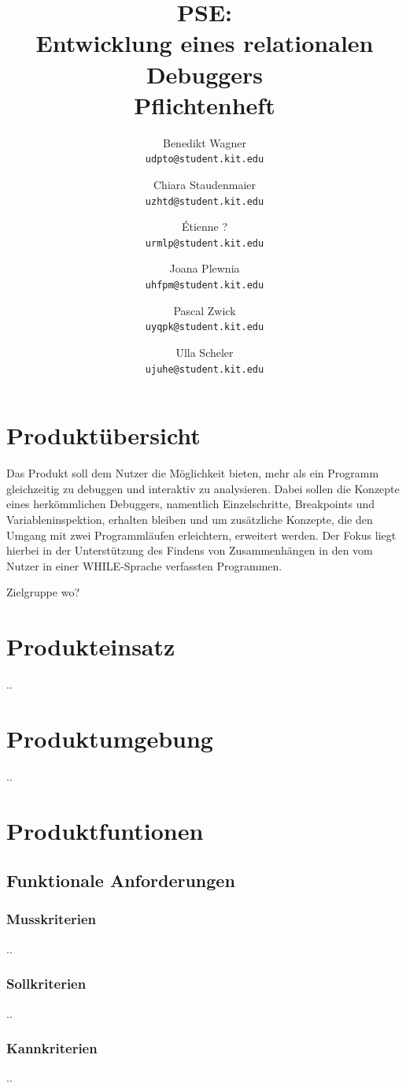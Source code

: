 \documentclass[parskip=full]{scrartcl}
\title{PSE:\\ Entwicklung eines relationalen Debuggers\\ Pflichtenheft}
\author{
	Benedikt Wagner\\
	\texttt{udpto@student.kit.edu}
	\and Chiara Staudenmaier\\
	\texttt{uzhtd@student.kit.edu}
	\and Étienne ?\\
	\texttt{urmlp@student.kit.edu}
	\and Joana Plewnia\\
	\texttt{uhfpm@student.kit.edu} 
	\and Pascal Zwick\\
	\texttt{uyqpk@student.kit.edu}
	\and Ulla Scheler\\
	\texttt{ujuhe@student.kit.edu}
}
\begin{document}
\maketitle
\newpage

\tableofcontents
\newpage

\section{Produktübersicht}
Das Produkt soll dem Nutzer die Möglichkeit bieten, mehr als ein Programm gleichzeitig zu debuggen und interaktiv zu analysieren. Dabei sollen die Konzepte eines herkömmlichen Debuggers, namentlich Einzelschritte, Breakpoints und Variableninspektion, erhalten bleiben und um zusätzliche Konzepte, die den Umgang mit zwei Programmläufen erleichtern, erweitert werden. Der Fokus liegt hierbei in der Unterstützung des Findens von Zusammenhängen in den vom Nutzer in einer WHILE-Sprache verfassten Programmen.

Zielgruppe wo?

\section{Produkteinsatz}
..

\section{Produktumgebung}
..

\section{Produktfuntionen}
	\subsection{Funktionale Anforderungen}
		\subsubsection{Musskriterien}
		..
		\subsubsection{Sollkriterien}
		..
		\subsubsection{Kannkriterien}
		..
\end{document}
